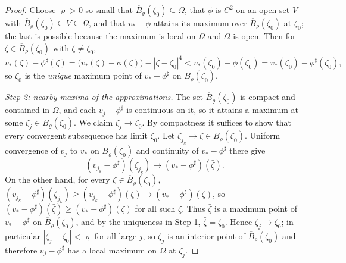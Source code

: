 \begin{proof}
Choose $\varrho>0$ so small that $\overline B_\varrho(\zeta_0)\subseteq\Omega$,
that $\phi$ is $C^2$ on an open set $V$ with
$\overline B_\varrho(\zeta_0)\subseteq V\subseteq\Omega$, and that $v_*-\phi$
attains its maximum over $\overline B_\varrho(\zeta_0)$ at $\zeta_0$; the last is
possible because the maximum is local on $\Omega$ and $\Omega$ is open. Then for
$\zeta\in\overline B_\varrho(\zeta_0)$ with $\zeta\ne\zeta_0$,
\[
  v_*(\zeta)-\phi^\sharp(\zeta)
   =\bigl(v_*(\zeta)-\phi(\zeta)\bigr)-|\zeta-\zeta_0|^4
   <v_*(\zeta_0)-\phi(\zeta_0)=v_*(\zeta_0)-\phi^\sharp(\zeta_0),
\]
so $\zeta_0$ is the \emph{unique} maximum point of $v_*-\phi^\sharp$ on
$\overline B_\varrho(\zeta_0)$.

\emph{Step 2: nearby maxima of the approximations.}
The set $\overline B_\varrho(\zeta_0)$ is compact and contained in $\Omega$, and
each $v_j-\phi^\sharp$ is continuous on it, so it attains a maximum at some
$\zeta_j\in\overline B_\varrho(\zeta_0)$. We claim $\zeta_j\to\zeta_0$. By
compactness it suffices to show that every convergent subsequence has limit
$\zeta_0$. Let $\zeta_{j_k}\to\bar\zeta\in\overline B_\varrho(\zeta_0)$. Uniform
convergence of $v_j$ to $v_*$ on $\overline B_\varrho(\zeta_0)$ and continuity of
$v_*-\phi^\sharp$ there give
\[
  (v_{j_k}-\phi^\sharp)(\zeta_{j_k})\longrightarrow
  (v_*-\phi^\sharp)(\bar\zeta).
\]
On the other hand, for every $\zeta\in\overline B_\varrho(\zeta_0)$,
$(v_{j_k}-\phi^\sharp)(\zeta_{j_k})\ge(v_{j_k}-\phi^\sharp)(\zeta)
 \to(v_*-\phi^\sharp)(\zeta)$, so
$(v_*-\phi^\sharp)(\bar\zeta)\ge(v_*-\phi^\sharp)(\zeta)$ for all such $\zeta$.
Thus $\bar\zeta$ is a maximum point of $v_*-\phi^\sharp$ on
$\overline B_\varrho(\zeta_0)$, and by the uniqueness in Step 1,
$\bar\zeta=\zeta_0$. Hence $\zeta_j\to\zeta_0$; in particular
$|\zeta_j-\zeta_0|<\varrho$ for all large $j$, so $\zeta_j$ is an interior point
of $\overline B_\varrho(\zeta_0)$ and therefore $v_j-\phi^\sharp$ has a local
maximum on $\Omega$ at $\zeta_j$.


\end{proof}

